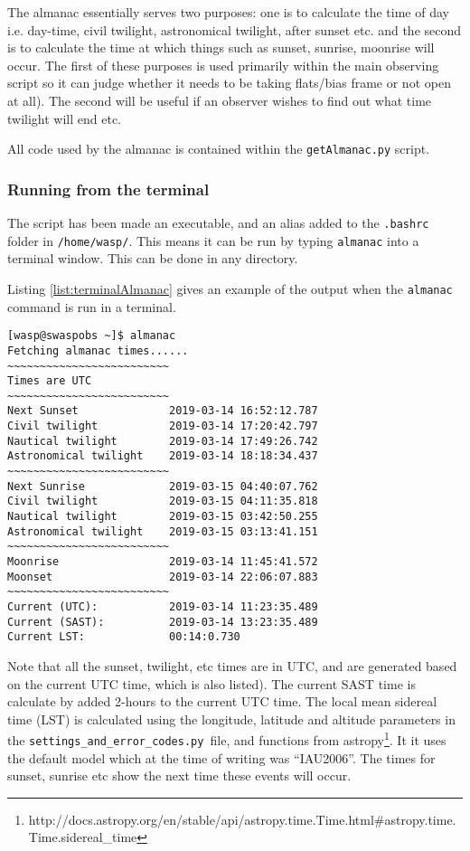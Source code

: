 \documentclass[a4paper,12pt]{article}
\begin{document}
The almanac essentially serves two purposes: one is to calculate the time of day i.e. day-time, civil twilight, astronomical twilight, after sunset etc. and the second is to calculate the time at which things such as sunset, sunrise, moonrise will occur. The first of these purposes is used primarily within the main observing script so it can judge whether it needs to be taking flats/bias frame or not open at all). The second will be useful if an observer wishes to find out what time twilight will end etc.

All code used by the almanac is contained within the {\texttt{getAlmanac.py}} script.

\subsubsection{Running from the terminal}
\label{subsec:almanacTerminal}

The script has been made an executable, and an alias added to the {\texttt{.bashrc}} folder in {\texttt{/home/wasp/}}. This means it can be run by typing {\tt{almanac}} into a terminal window. This can be done in any directory.

Listing \ref{list:terminalAlmanac} gives an example of the output when the {\tt almanac} command is run in a terminal.

\begin{lstlisting}[caption={Output from the {\tt almanac} terminal command}, label={list:terminalAlmanac}]
[wasp@swaspobs ~]$ almanac
Fetching almanac times......
~~~~~~~~~~~~~~~~~~~~~~~~~
Times are UTC
~~~~~~~~~~~~~~~~~~~~~~~~~
Next Sunset		         2019-03-14 16:52:12.787
Civil twilight		     2019-03-14 17:20:42.797
Nautical twilight	     2019-03-14 17:49:26.742
Astronomical twilight	 2019-03-14 18:18:34.437
~~~~~~~~~~~~~~~~~~~~~~~~~
Next Sunrise		     2019-03-15 04:40:07.762
Civil twilight		     2019-03-15 04:11:35.818
Nautical twilight    	 2019-03-15 03:42:50.255
Astronomical twilight	 2019-03-15 03:13:41.151
~~~~~~~~~~~~~~~~~~~~~~~~~
Moonrise		         2019-03-14 11:45:41.572
Moonset			         2019-03-14 22:06:07.883
~~~~~~~~~~~~~~~~~~~~~~~~~
Current (UTC):		     2019-03-14 11:23:35.489
Current (SAST):	    	 2019-03-14 13:23:35.489
Current LST:		     00:14:0.730
\end{lstlisting}%

Note that all the sunset, twilight, etc times are in UTC, and are generated based on the current UTC time, which is also listed). The current SAST time is calculate by added 2-hours to the current UTC time. The local mean sidereal time (LST) is calculated using the longitude, latitude and altitude parameters in the {\tt{settings\_and\_error\_codes.py} }file, and functions from astropy{\footnote{http://docs.astropy.org/en/stable/api/astropy.time.Time.html\#astropy.time.\\ \indent\indent Time.sidereal\_time}}. It it uses the default model which at the time of writing was ``IAU2006''. The times for sunset, sunrise etc show the next time these events will occur. 
\end{document}
